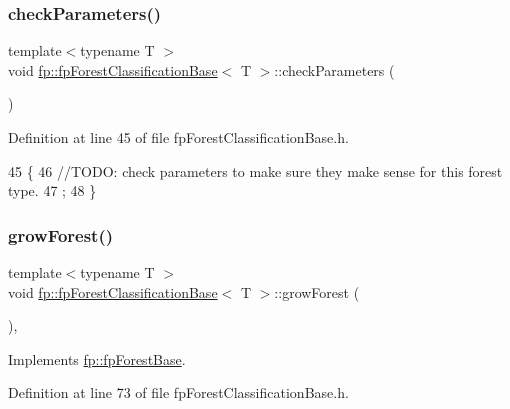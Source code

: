 \subsubsection{\texorpdfstring{check\+Parameters()}{checkParameters()}}
{\footnotesize\ttfamily template$<$typename T $>$ \\
void \hyperlink{classfp_1_1fpForestClassificationBase}{fp\+::fp\+Forest\+Classification\+Base}$<$ T $>$\+::check\+Parameters (\begin{DoxyParamCaption}{ }\end{DoxyParamCaption})\hspace{0.3cm}{\ttfamily [inline]}}



Definition at line 45 of file fp\+Forest\+Classification\+Base.\+h.


\begin{DoxyCode}
45                                          \{
46                 \textcolor{comment}{//TODO: check parameters to make sure they make sense for this forest type.}
47                 ;
48             \}
\end{DoxyCode}
\mbox{\label{classfp_1_1fpForestClassificationBase_a706225fdbef8c71fb022f4c3446b388d}} 
\subsubsection{\texorpdfstring{grow\+Forest()}{growForest()}}
{\footnotesize\ttfamily template$<$typename T $>$ \\
void \hyperlink{classfp_1_1fpForestClassificationBase}{fp\+::fp\+Forest\+Classification\+Base}$<$ T $>$\+::grow\+Forest (\begin{DoxyParamCaption}{ }\end{DoxyParamCaption})\hspace{0.3cm}{\ttfamily [inline]}, {\ttfamily [virtual]}}



Implements \hyperlink{classfp_1_1fpForestBase_a05b1d924a559536083ee7a8cf3ea542d}{fp\+::fp\+Forest\+Base}.



Definition at line 73 of file fp\+Forest\+Classification\+Base.\+h.


